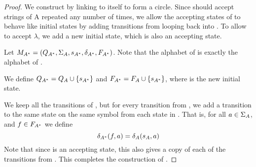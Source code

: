 \documentclass{bcthesis}
\begin{document}
\begin{proof}
		We construct \mas by linking \ma to itself to form a circle. %
		Since \mas should accept strings of A repeated any number of times, we allow the accepting states of \ma to behave like initial states by adding transitions from \fa looping back into \ma.
		To allow \mas to accept $\lambda$, we add a new initial state, which is also an accepting state.

		Let $M_{A^*} = (Q_{A^*}, \Sigma_A, s_{A^*}, \delta_{A^*}, F_{A^*})$.
		Note that the alphabet of \mas is exactly the alphabet of \ma.

		We define $Q_{A^*} = Q_A \cup \{ s_{A^*} \}$ and $F_{A^*} = F_A \cup \{ s_{A^*} \}$, where \sas is the new initial state.

		We keep all the transitions of \ma, but for every transition from \sa, we add a transition to the same state on the same symbol from each state in \fas.
		That is, for all $a \in \Sigma_A$, and $f \in F_{A^*}$ we define 
		\[
			\delta_{A^*}(f, a) = \delta_A(s_A, a)
		\]
		Note that since \sas is an accepting state, this also gives \sas a copy of each of the transitions from \sa.
		This completes the construction of \mas.
	\end{proof}
\end{document}
